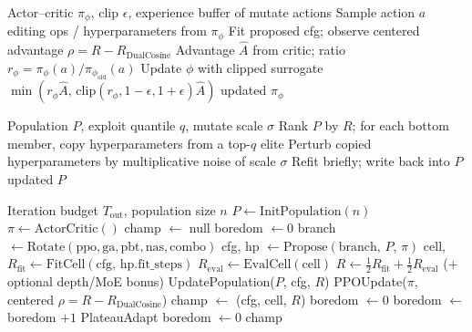 \begin{algorithm}[H]
\caption{PPO architecture update}
\label{alg:ppo}
\begin{algorithmic}[1]
\Require Actor--critic $\pi_\phi$, clip $\epsilon$, experience buffer of mutate actions
\State Sample action $a$ editing ops / hyperparameters from $\pi_\phi$
\State Fit proposed cfg; observe centered advantage $\rho = R - R_{\mathrm{DualCosine}}$ 
\State Advantage $\hat{A}$ from critic; ratio $r_\phi = \pi_\phi(a)/\pi_{\phi_{\mathrm{old}}}(a)$
\State Update $\phi$ with clipped surrogate $\min(r_\phi\hat{A},\,\mathrm{clip}(r_\phi,1-\epsilon,1+\epsilon)\hat{A})$
\State \Return updated $\pi_\phi$
\end{algorithmic}
\end{algorithm}

\begin{algorithm}[H]
\caption{PBT exploit--mutate}
\label{alg:pbt}
\begin{algorithmic}[1]
\Require Population $P$, exploit quantile $q$, mutate scale $\sigma$
\State Rank $P$ by $R$; for each bottom member, copy hyperparameters from a top-$q$ elite
\State Perturb copied hyperparameters by multiplicative noise of scale $\sigma$
\State Refit briefly; write back into $P$
\State \Return updated $P$
\end{algorithmic}
\end{algorithm}

\begin{algorithm}[H]
\caption{HybridMetaSearch}
\label{alg:hybrid}
\begin{algorithmic}[1]
\Require Iteration budget $T_{\mathrm{out}}$, population size $n$
\State $P \gets \mathrm{InitPopulation}(n)$
\State $\pi \gets \mathrm{ActorCritic}()$
\State champ $\gets$ null
\State boredom $\gets 0$
    \State branch $\gets \mathrm{Rotate}(\mathrm{ppo},\mathrm{ga},\mathrm{pbt},\mathrm{nas},\mathrm{combo})$
    \State cfg, hp $\gets \mathrm{Propose}(\mathrm{branch},\,P,\,\pi)$
    \State cell, $R_{\mathrm{fit}} \gets \mathrm{FitCell}(\mathrm{cfg},\,\mathrm{hp.fit\_steps})$
    \State $R_{\mathrm{eval}} \gets \mathrm{EvalCell}(\mathrm{cell})$
    \State $R \gets \tfrac12 R_{\mathrm{fit}} + \tfrac12 R_{\mathrm{eval}}$ (+ optional depth/MoE bonus)
    \State UpdatePopulation($P$, cfg, $R$)
    \State PPOUpdate($\pi$, centered $\rho = R - R_{\mathrm{DualCosine}}$)
      \State champ $\gets$ (cfg, cell, $R$)
      \State boredom $\gets 0$
    \Else
      \State boredom $\gets$ boredom $+1$
    \EndIf
      \State PlateauAdapt
      \State boredom $\gets 0$
    \EndIf
\EndFor
\State \Return champ
\end{algorithmic}
\end{algorithm}
